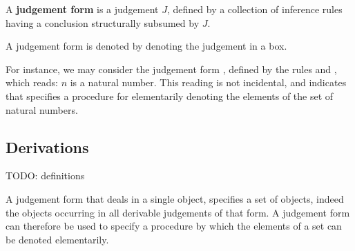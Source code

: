 \begin{definition}

A \textbf{judgement form} is a judgement $J$, defined by a collection of
inference rules having a conclusion structurally subsumed by $J$.

\end{definition}

\begin{notation}

A judgement form is denoted by denoting the judgement in a box.

\end{notation}

For instance, we may consider the judgement form ,
defined by the rules  and , which reads: $n$ is
a natural number. This reading is not incidental, and indicates that
 specifies a procedure for elementarily denoting the
elements of the set of natural numbers.

\subsection{Derivations}









TODO: definitions

A judgement form that deals in a single object, specifies a set of objects,
indeed the objects occurring in all derivable judgements of that form. A
judgement form can therefore be used to specify a procedure by which the
elements of a set can be denoted elementarily.


